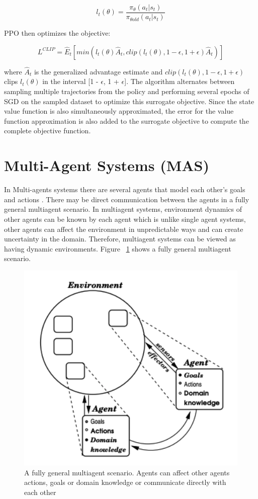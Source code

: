 \documentclass[12pt]{report}
\begin{document}
\[ l_t(\theta) = \frac{\pi_\theta(a_t | s_t)}{\pi_{\theta old}(a_t | s_t)}\]

\hfill \break
PPO then optimizes the objective: 

\[ L^{CLIP} = \hat{E}_t [min(l_t(\theta) \hat{A}_t, clip(l_t (\theta) , 1- \epsilon , 1+\epsilon)\hat{A}_t)] \]

\hfill \break
where $\hat{A}_t$ is the generalized advantage estimate and $clip(l_t (\theta) , 1- \epsilon , 1+\epsilon)$ clips $l_t(\theta)$ in the interval [1 - $\epsilon$, 1 + $\epsilon$]. The algorithm alternates between sampling multiple trajectories from the policy and performing several epochs of SGD on the
sampled dataset to optimize this surrogate objective. Since the state value function is also simultaneously approximated, the error for the value function approximation is also added to the surrogate
objective to compute the complete objective function. 

\section{Multi-Agent Systems (MAS)}

In Multi-agents systems there are several agents that model each other's goals and actions \cite{Stone}. There may be direct communication between the agents in a fully general multiagent scenario. In multiagent systems, environment dynamics of other agents can be known by each agent which is unlike single agent systems, other agents can affect the environment in unpredictable ways and can create uncertainty in the domain. Therefore, multiagent systems can be viewed as having dynamic environments. Figure ~\ref{fig:MultiAgentSystem} shows a fully general multiagent scenario. 

\begin{figure}[!h]
    \centering
    \includegraphics[width=12cm]{MultiAgentSystem.png}
    \caption{A fully general multiagent scenario. Agents can affect other agents actions, goals or domain knowledge or communicate directly with each other \cite{Stone}}
    \label{fig:MultiAgentSystem}
\end{figure}
\end{document}
